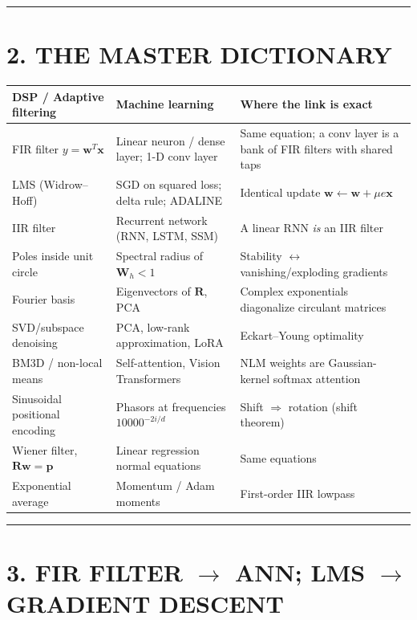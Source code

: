 \documentclass[11pt,a4paper]{article}
\begin{document}
\noindent\rule{\textwidth}{0.5pt}

\section{2. THE MASTER DICTIONARY}
\begin{table}[H]
\centering
\small
\begin{tabular}{p{4.0cm}p{4.0cm}p{6.5cm}}
\toprule
\textbf{DSP / Adaptive filtering} & \textbf{Machine learning} & \textbf{Where the link is exact} \\
\midrule
FIR filter $y=\mathbf{w}^T\mathbf{x}$ & Linear neuron / dense layer; 1-D conv layer & Same equation; a conv layer is a bank of FIR filters with shared taps \\
LMS (Widrow--Hoff) & SGD on squared loss; delta rule; ADALINE & Identical update $\mathbf{w}\!\leftarrow\!\mathbf{w}+\mu e\mathbf{x}$ \\
IIR filter & Recurrent network (RNN, LSTM, SSM) & A linear RNN \emph{is} an IIR filter \\
Poles inside unit circle & Spectral radius of $\mathbf{W}_h<1$ & Stability $\leftrightarrow$ vanishing/exploding gradients \\
Fourier basis & Eigenvectors of $\mathbf{R}$, PCA & Complex exponentials diagonalize circulant matrices \\
SVD/subspace denoising & PCA, low-rank approximation, LoRA & Eckart--Young optimality \\
BM3D / non-local means & Self-attention, Vision Transformers & NLM weights are Gaussian-kernel softmax attention \\
Sinusoidal positional encoding & Phasors at frequencies $10000^{-2i/d}$ & Shift $\Rightarrow$ rotation (shift theorem) \\
Wiener filter, $\mathbf{R}\mathbf{w}=\mathbf{p}$ & Linear regression normal equations & Same equations \\
Exponential average & Momentum / Adam moments & First-order IIR lowpass \\
\bottomrule
\end{tabular}
\end{table}

\noindent\rule{\textwidth}{0.5pt}

\section{3. FIR FILTER $\to$ ANN; LMS $\to$ GRADIENT DESCENT}
\end{document}
